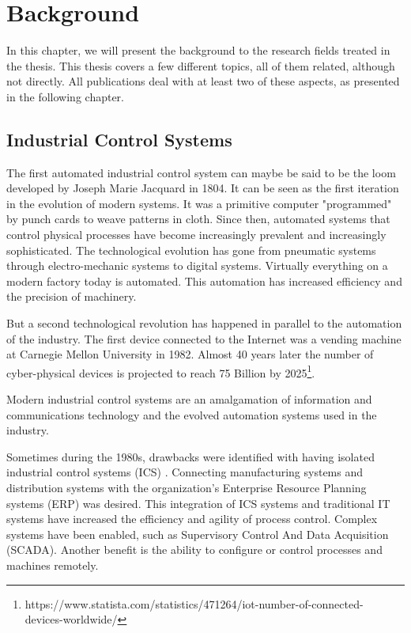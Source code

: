 \chapter{Background}
\label{ch:background}
In this chapter, we will present the background to the research fields treated in the thesis. 
This thesis covers a few different topics, all of them related, although not directly. All publications deal with at least two of these aspects, as presented in the following chapter.

\section{Industrial Control Systems}
\label{sec:cps}
The first automated industrial control system can maybe be said to be the loom developed by Joseph Marie Jacquard in 1804. It can be seen as the first iteration in the evolution of modern systems. It was a primitive computer "programmed" by punch cards to weave patterns in cloth. Since then, automated systems that control physical processes have become increasingly prevalent and increasingly sophisticated. The technological evolution has gone from pneumatic systems through electro-mechanic systems to digital systems.
Virtually everything on a modern factory today is automated. This automation has increased efficiency and the precision of machinery.

But a second technological revolution has happened in parallel to the automation of the industry.
The first device connected to the Internet was a vending machine at Carnegie Mellon University in 1982. Almost 40 years later the number of cyber-physical devices is projected to reach 75 Billion by 2025\footnote{https://www.statista.com/statistics/471264/iot-number-of-connected-
devices-worldwide/}. 

Modern industrial control systems are an amalgamation of information and communications technology and the evolved automation systems used in the industry. 

Sometimes during the 1980s, drawbacks were identified with having isolated industrial control systems (ICS) \cite{wollschlaeger2017future}. Connecting manufacturing systems and distribution systems with the organization's Enterprise Resource Planning systems (ERP) was desired. This integration of ICS systems and traditional IT systems have increased the efficiency and agility of process control. Complex systems have been enabled, such as Supervisory Control And Data Acquisition (SCADA). Another benefit is the ability to configure or control processes and machines remotely.

